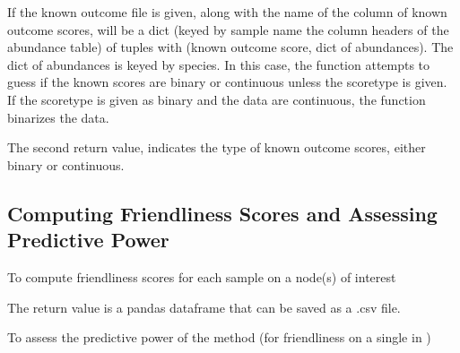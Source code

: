 \documentclass[letterpaper,10pt,english]{sphinxmanual}
\begin{document}
\sphinxAtStartPar
If the known outcome file is given, along with the name of the column of known outcome scores,  will be a dict (keyed by sample name \sphinxhyphen{} the column headers of the abundance table) of
tuples with (known outcome score, dict of abundances). The dict of abundances is keyed by species. In this case, the function attempts to guess if the known scores are binary or continuous unless the
scoretype is given. If the scoretype is given as binary and the data are continuous, the function binarizes the data.

\sphinxAtStartPar
The second return value,  indicates the type of known outcome scores, either binary or continuous.


\subsection{Computing Friendliness Scores and Assessing Predictive Power}
\label{\detokenize{usage:computing-friendliness-scores-and-assessing-predictive-power}}
\sphinxAtStartPar
To compute friendliness scores for each sample on a node(s) of interest

\begin{sphinxVerbatim}[commandchars=\\\{\}]
   

  
   
    \PYG{p}{[}\PYG{p}{]}  
\end{sphinxVerbatim}

\sphinxAtStartPar
The return value is a pandas dataframe that can be saved as a .csv file.

\sphinxAtStartPar
To assess the predictive power of the method (for friendliness on a single  in )

\begin{sphinxVerbatim}[commandchars=\\\{\}]
   

  
\end{sphinxVerbatim}
\end{document}
